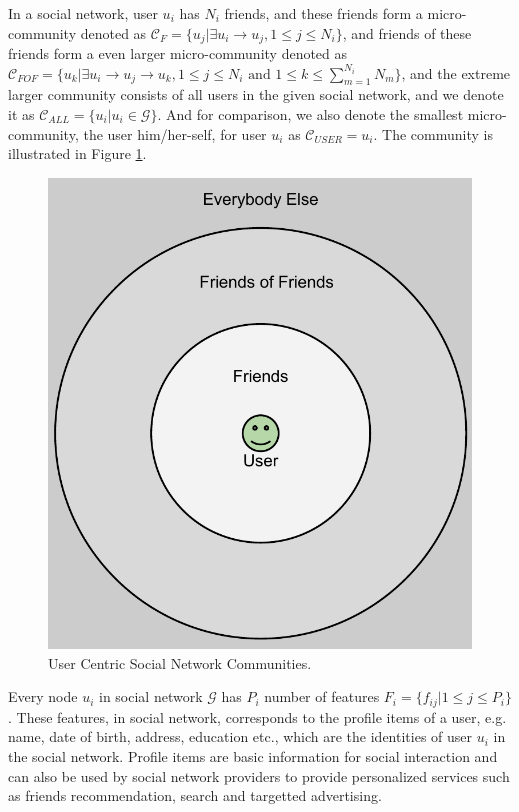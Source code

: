 \documentclass[a4paper]{article}
\begin{document}
In a social network, user $u_i$ has $N_i$ friends, and these friends
form a micro-community denoted as $\mathcal{C}_F=\{u_j|\exists u_i\rightarrow
u_j, 1\leq j\leq N_i\}$, and friends of these friends form a even larger
micro-community denoted as $\mathcal{C}_{FOF} = \{u_k|\exists u_i\rightarrow
u_j\rightarrow u_k, 1\leq j\leq N_i \mbox{ and } 1\leq k \leq
\sum_{m=1}^{N_i}N_m \}$, and the extreme larger community consists of
all users in the given social network, and we denote it as $\mathcal{C}_{ALL} =
\{ u_i|u_i\in\mathcal{G} \}$. And for comparison, we also denote the
smallest micro-community, the user him/her-self, for user $u_i$ as
$\mathcal{C}_{USER} = u_i$. The community is illustrated in Figure
\ref{fig:social_circle}.
\begin{figure}[ht]
  \centering
  \includegraphics[width=.5\textwidth]{Privacy_Friendship_Circles.pdf}
  \caption{User Centric Social Network Communities. }
  \label{fig:social_circle}
\end{figure}

Every node $u_i$ in social network $\mathcal{G}$ has $P_i$ number of
features $F_{i}=\{f_{ij}|1\leq j\leq P_i\}$. These
features, in social network, corresponds to the profile items of a
user, e.g. name, date of birth, address, education etc., which are the
identities of user $u_i$ in the social network. Profile items
are basic information for social interaction and can also be used by
social network providers to provide personalized 
services such as friends recommendation, search and targetted
advertising. 
\end{document}
